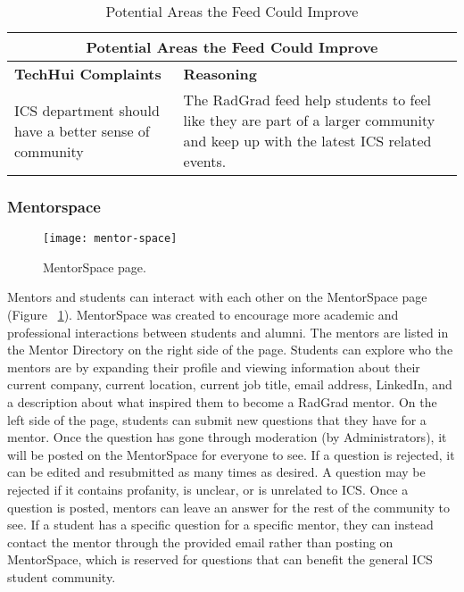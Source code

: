 \begin{table}[htbp!]
\centering
\begin{tabular}{  |p{4cm}|p{12cm}| } 
\hline
 \multicolumn{2}{|c|}{Potential Areas the Feed Could Improve}\\
  \hline
 \textbf{TechHui Complaints} & \textbf{Reasoning} \\ 
  \hline
ICS department should have a better sense of community & The RadGrad feed help students to feel like they are part of a larger community and keep up with the latest ICS related events. \\
\hline
\end{tabular}
 \caption{Potential Areas the Feed Could Improve}
\end{table}

\subsubsection{Mentorspace}

\begin{figure}[htbp!]
\centering
\texttt{[image: mentor-space]}
\caption{MentorSpace page.}
\label{mentorspace}
\end{figure}
Mentors and students can interact with each other on the MentorSpace page (Figure ~\ref{mentorspace}). MentorSpace was created to encourage more academic and professional interactions between students and alumni. The mentors are listed in the Mentor Directory on the right side of the page. Students can explore who the mentors are by expanding their profile and viewing information about their current company, current location, current job title, email address, LinkedIn, and a description about what inspired them to become a RadGrad mentor. On the left side of the page, students can submit new questions that they have for a mentor. Once the question has gone through moderation (by  Administrators), it will be posted on the MentorSpace for everyone to see. If a question is rejected, it can be edited and resubmitted as many times as desired. A question may be rejected if it contains profanity, is unclear, or is unrelated to ICS. Once a question is posted, mentors can leave an answer for the rest of the community to see. If a student has a specific question for a specific mentor, they can instead contact the mentor through the provided email rather than posting on MentorSpace, which is reserved for questions that can benefit the general ICS student community. 

